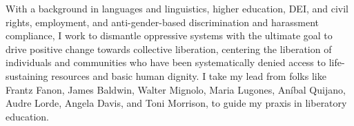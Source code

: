

\begin{cvparagraph}

With a background in languages and linguistics, higher education, DEI, and civil rights, employment, and anti-gender-based discrimination and harassment compliance, I work to dismantle oppressive systems with the ultimate goal to drive positive change towards collective liberation, centering the liberation of individuals and communities who have been systematically denied access to life-sustaining resources and basic human dignity. I take my lead from folks like Frantz Fanon, James Baldwin, Walter Mignolo, Maria Lugones, An\'{i}bal Quijano, Audre Lorde, Angela Davis, and Toni Morrison, to guide my praxis in liberatory education.
\end{cvparagraph}

